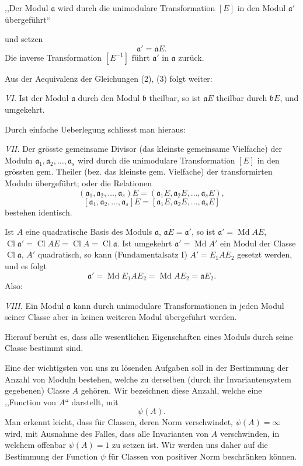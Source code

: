 \documentclass[11pt,a4paper]{article}
\newcommand{\Cl}{\operatorname{Cl}}
\newcommand{\Md}{\operatorname{Md}}
\begin{document}
,,Der Modul $\mathfrak a$ wird durch die unimodulare Transformation $[E]$ in den Modul $\mathfrak a'$ übergeführt``

und setzen
\[
 \mathfrak a'=\mathfrak a E.
\]
Die inverse Transformation $[E^{-1}]$ führt $\mathfrak a'$ in $\mathfrak a$ zurück.

Aus der Aequivalenz der Gleichungen (2), (3) folgt weiter:

\emph{VI.} Ist der Modul $\mathfrak a$ durch den Modul $\mathfrak b$ theilbar, so ist $\mathfrak a E$ theilbar durch $\mathfrak bE$, und umgekehrt.

Durch einfache Ueberlegung schliesst man hieraus:

\emph{VII.} Der grösste gemeinsame Divisor (das kleinste gemeinsame Vielfache) der Moduln $\mathfrak a_1,\mathfrak a_2,\ldots,\mathfrak a_s$ wird durch die unimodulare Transformation $[E]$ in den grössten gem. Theiler (bez. das kleinste gem. Vielfache) der transformirten Moduln übergeführt; oder die Relationen
\[
 (\mathfrak a_1,\mathfrak a_2,\ldots,\mathfrak a_s)E
 =(\mathfrak a_1E,\mathfrak a_2E,\ldots,\mathfrak a_sE),
\]
\[
 [\mathfrak a_1,\mathfrak a_2,\ldots,\mathfrak a_s]E
 =[\mathfrak a_1E,\mathfrak a_2E,\ldots,\mathfrak a_sE]
\]
bestehen identisch.

Ist $A$ eine quadratische Basis des Moduls $\mathfrak a$, $\mathfrak aE=\mathfrak a'$, so ist $\mathfrak a'=\Md AE$, $\Cl\mathfrak a'=\Cl AE=\Cl A=\Cl\mathfrak a$. Ist umgekehrt $\mathfrak a'=\Md A'$ ein Modul der Classe $\Cl\mathfrak a$, $A'$ quadratisch, so kann (Fundamentalsatz I) $A'=E_1AE_2$ gesetzt werden, und es folgt
\[
 \mathfrak a'=\Md E_1AE_2=\Md AE_2=\mathfrak a E_2.
\]
Also:

\emph{VIII.} Ein Modul $\mathfrak a$ kann durch unimodulare Transformationen in jeden Modul seiner Classe aber in keinen weiteren Modul übergeführt werden.

Hierauf beruht es, dass alle wesentlichen Eigenschaften eines Moduls durch seine Classe bestimmt sind.

Eine der wichtigsten von uns zu lösenden Aufgaben soll in der Bestimmung der Anzahl von Moduln bestehen, welche zu derselben (durch ihr Invariantensystem gegebenen) Classe $A$ gehören. Wir bezeichnen diese Anzahl, welche eine ,,Function von $A$`` darstellt, mit
\[
 \psi(A).
\]
Man erkennt leicht, dass für Classen, deren Norm verschwindet, $\psi(A)=\infty$ wird, mit Ausnahme des Falles, dass alle Invarianten von $A$ verschwinden, in welchem offenbar $\psi(A)=1$ zu setzen ist. Wir werden uns daher auf die Bestimmung der Function $\psi$ für Classen von positiver Norm beschränken können.
\end{document}
